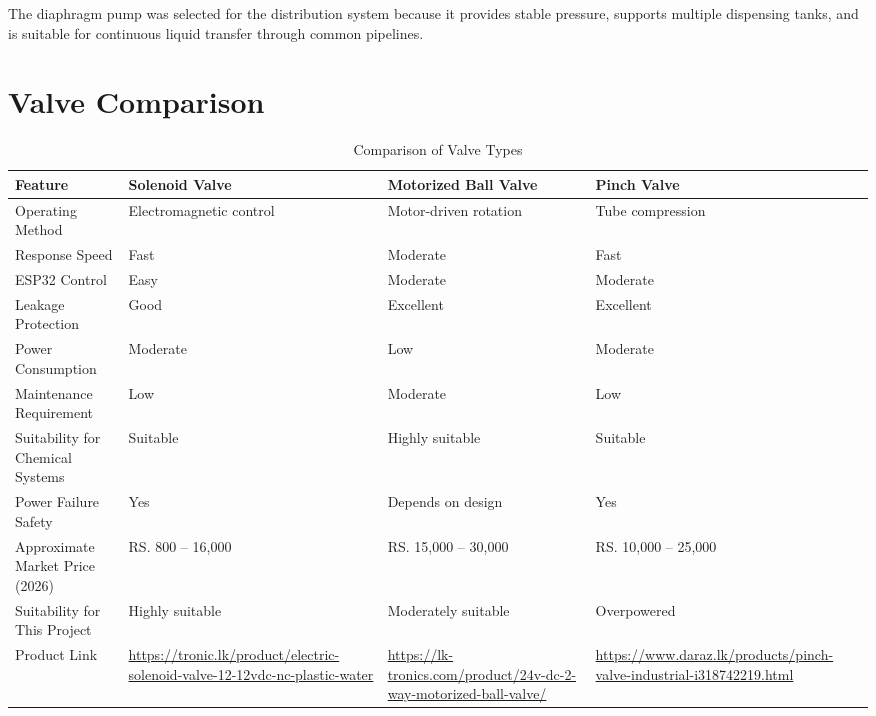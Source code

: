 \documentclass[12pt,a4paper]{report}
\begin{document}
The diaphragm pump was selected for the distribution system because it provides stable pressure, supports multiple dispensing tanks, and is suitable for continuous liquid transfer through common pipelines.

\section{Valve Comparison}

\begin{table}[H]
\centering
\small
\begin{tabularx}{\textwidth}{|p{3cm}|>{\raggedright\arraybackslash}X|>{\raggedright\arraybackslash}X|>{\raggedright\arraybackslash}X|}
\hline
\textbf{Feature} & \textbf{Solenoid Valve} & \textbf{Motorized Ball Valve} & \textbf{Pinch Valve} \\
\hline

Operating Method &
Electromagnetic control &
Motor-driven rotation &
Tube compression \\
\hline

Response Speed &
Fast &
Moderate &
Fast \\
\hline

ESP32 Control &
Easy &
Moderate &
Moderate \\
\hline

Leakage Protection &
Good &
Excellent &
Excellent \\
\hline

Power Consumption &
Moderate &
Low &
Moderate \\
\hline

Maintenance Requirement &
Low &
Moderate &
Low \\
\hline

Suitability for Chemical Systems &
Suitable &
Highly suitable &
Suitable \\
\hline

Power Failure Safety &
Yes &
Depends on design &
Yes \\
\hline

Approximate Market Price (2026) &
RS. 800 -- 16,000 &
RS. 15,000 -- 30,000 &
RS. 10,000 -- 25,000 \\
\hline

Suitability for This Project &
Highly suitable &
Moderately suitable &
Overpowered \\
\hline

Product Link &
\url{https://tronic.lk/product/electric-solenoid-valve-12-12vdc-nc-plastic-water} &
\url{https://lk-tronics.com/product/24v-dc-2-way-motorized-ball-valve/} &
\url{https://www.daraz.lk/products/pinch-valve-industrial-i318742219.html} \\
\hline

\end{tabularx}
\caption{Comparison of Valve Types}
\end{table}
\end{document}
